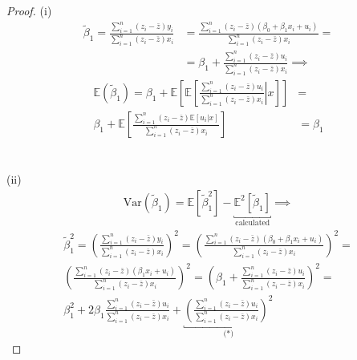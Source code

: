 \documentclass[12pt,reqno]{amsart}
\theoremstyle{plain}
\newcommand{\E}{\mathbb{E}}
\newcommand{\tb}{\tilde\beta}
\begin{document}
\begin{proof}
    (i)
    \begin{align*}
        \tb_1 = \frac{\sum_{i=1}^{n} (z_{i} - \bar{z})y_{i}}{\sum_{i=1}^{n} (z_{i} - \bar{z})x_{i}} & =
        \frac{\sum_{i=1}^{n} (z_{i} - \bar{z})(\beta_{0} + \beta_{1}x_i + u_i)}{\sum_{i=1}^{n} (z_{i} - \bar{z})x_{i}} =                                                                                         \\
                                                                                                    & = \beta_{1} + \frac{\sum_{i=1}^{n} (z_{i} - \bar{z})u_{i}}{\sum_{i=1}^{n} (z_{i} - \bar{z})x_{i}} \implies
    \end{align*}
    \begin{align*}
        \E(\tb_{1}) = \beta_{1} + \E \left[ \E \left[\left. \frac{\sum_{i=1}^{n} (z_{i} - \bar{z})u_{i}}{\sum_{i=1}^{n} (z_{i} - \bar{z})x_{i}}  \right\vert x \right] \right] & =           \\
        \beta_{1} + \E \left[  \frac{\sum_{i=1}^{n} (z_{i} - \bar{z})\E \left[\left.u_{i}\right\vert x \right]}{\sum_{i=1}^{n} (z_{i} - \bar{z})x_{i}}   \right]               & = \beta_{1}
    \end{align*}
    \\\\
    (ii)
    \begin{align*}
        \text{Var}(\tb_{1}) = \E \left[ \tb^{2}_1 \right] - \underbracket{\E^{2} \left[ \tb_1 \right]}_{\text{calculated}} \implies
    \end{align*}
    \begin{gather*}
        \tb_1^{2} =  \left( \frac{\sum_{i=1}^{n} (z_{i} - \bar{z})y_{i}}{\sum_{i=1}^{n} (z_{i} - \bar{z})x_{i}}\right)^{2} =
        \left( \frac{\sum_{i=1}^{n} (z_{i} - \bar{z})(\beta_{0} + \beta_{1}x_{i} + u_{i})}{\sum_{i=1}^{n} (z_{i} - \bar{z})x_{i}}\right)^{2} = \\
        \left( \frac{\sum_{i=1}^{n} (z_{i} - \bar{z})(\beta_{1}x_{i} + u_{i})}{\sum_{i=1}^{n} (z_{i} - \bar{z})x_{i}}\right)^{2} =
        \left( \beta_{1} + \frac{\sum_{i=1}^{n} (z_{i} - \bar{z})u_{i}}{\sum_{i=1}^{n} (z_{i} - \bar{z})x_{i}} \right)^{2} =                   \\
        \beta_{1}^{2} + 2\beta_{1}\frac{\sum_{i=1}^{n} (z_{i} - \bar{z})u_{i}}{\sum_{i=1}^{n} (z_{i} - \bar{z})x_{i}} + \underbracket{\left(\frac{\sum_{i=1}^{n} (z_{i} - \bar{z})u_{i}}{\sum_{i=1}^{n} (z_{i} - \bar{z})x_{i}} \right)^{2}}_{\textbf{(*)}}
    \end{gather*}

\end{proof}
\end{document}
